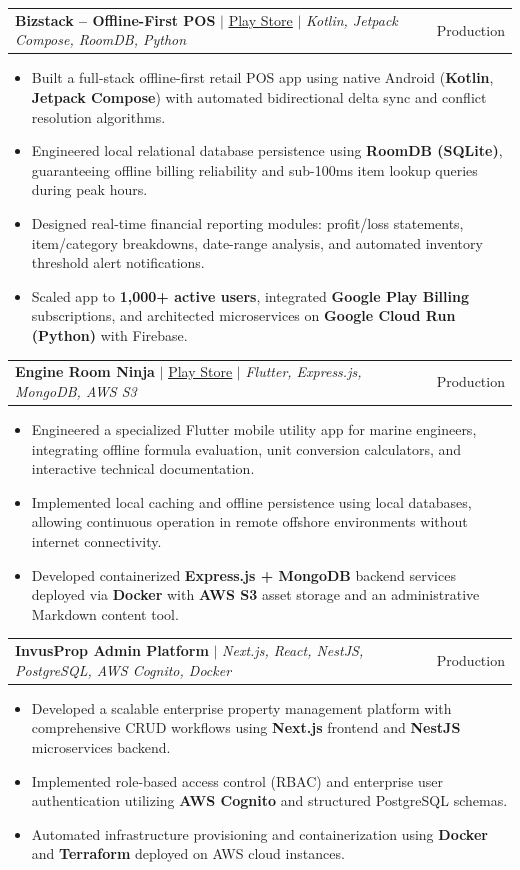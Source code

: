 \documentclass[letterpaper,10pt]{article}
\makeatletter
\newcommand{\resumeItem}[1]{
  \item\small{
    {#1 \vspace{-2pt}}
  }
}
\newcommand{\resumeProjectHeading}[2]{
    \item
    \begin{tabular*}{0.97\textwidth}{l@{\extracolsep{\fill}}r}
      \small#1 & #2 \\
    \end{tabular*}\vspace{-6pt}
}
\newcommand{\resumeItemListStart}{\begin{itemize}[leftmargin=0.15in]}
\newcommand{\resumeItemListEnd}{\end{itemize}\vspace{-4pt}}
\makeatother
\begin{document}
      \resumeProjectHeading
          {\textbf{Bizstack -- Offline-First POS} $|$ \href{https://play.google.com/store/apps/details?id=com.nativedesk.bizstack}{\underline{Play Store}} $|$ \emph{Kotlin, Jetpack Compose, RoomDB, Python}}{Production}
          \resumeItemListStart
            \resumeItem{Built a full-stack offline-first retail POS app using native Android (\textbf{Kotlin}, \textbf{Jetpack Compose}) with automated bidirectional delta sync and conflict resolution algorithms.}
            \resumeItem{Engineered local relational database persistence using \textbf{RoomDB (SQLite)}, guaranteeing offline billing reliability and sub-100ms item lookup queries during peak hours.}
            \resumeItem{Designed real-time financial reporting modules: profit/loss statements, item/category breakdowns, date-range analysis, and automated inventory threshold alert notifications.}
            \resumeItem{Scaled app to \textbf{1,000+ active users}, integrated \textbf{Google Play Billing} subscriptions, and architected microservices on \textbf{Google Cloud Run (Python)} with Firebase.}
          \resumeItemListEnd

      \resumeProjectHeading
          {\textbf{Engine Room Ninja} $|$ \href{https://play.google.com/store/apps/details?id=com.engine_room_ninja.marine_ninja}{\underline{Play Store}} $|$ \emph{Flutter, Express.js, MongoDB, AWS S3}}{Production}
          \resumeItemListStart
            \resumeItem{Engineered a specialized Flutter mobile utility app for marine engineers, integrating offline formula evaluation, unit conversion calculators, and interactive technical documentation.}
            \resumeItem{Implemented local caching and offline persistence using local databases, allowing continuous operation in remote offshore environments without internet connectivity.}
            \resumeItem{Developed containerized \textbf{Express.js + MongoDB} backend services deployed via \textbf{Docker} with \textbf{AWS S3} asset storage and an administrative Markdown content tool.}
          \resumeItemListEnd

      \resumeProjectHeading
          {\textbf{InvusProp Admin Platform} $|$ \emph{Next.js, React, NestJS, PostgreSQL, AWS Cognito, Docker}}{Production}
          \resumeItemListStart
            \resumeItem{Developed a scalable enterprise property management platform with comprehensive CRUD workflows using \textbf{Next.js} frontend and \textbf{NestJS} microservices backend.}
            \resumeItem{Implemented role-based access control (RBAC) and enterprise user authentication utilizing \textbf{AWS Cognito} and structured PostgreSQL schemas.}
            \resumeItem{Automated infrastructure provisioning and containerization using \textbf{Docker} and \textbf{Terraform} deployed on AWS cloud instances.}
          \resumeItemListEnd
\end{document}
